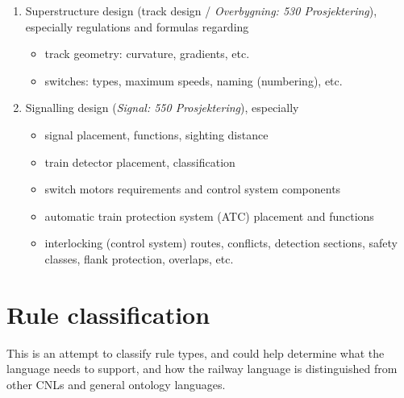 \documentclass[]{article}
\providecommand{\tightlist}{%
  \setlength{\itemsep}{0pt}\setlength{\parskip}{0pt}}
\begin{document}
\begin{enumerate}
\def\labelenumi{\arabic{enumi}.}
\tightlist
\item
  Superstructure design (track design / \emph{Overbygning: 530
  Prosjektering}), especially regulations and formulas regarding

  \begin{itemize}
  \tightlist
  \item
    track geometry: curvature, gradients, etc.
  \item
    switches: types, maximum speeds, naming (numbering), etc.
  \end{itemize}
\item
  Signalling design (\emph{Signal: 550 Prosjektering}), especially

  \begin{itemize}
  \tightlist
  \item
    signal placement, functions, sighting distance
  \item
    train detector placement, classification
  \item
    switch motors requirements and control system components
  \item
    automatic train protection system (ATC) placement and functions
  \item
    interlocking (control system) routes, conflicts, detection sections,
    safety classes, flank protection, overlaps, etc.
  \end{itemize}
\end{enumerate}

\section{Rule classification}\label{rule-classification}

This is an attempt to classify rule types, and could help determine what
the language needs to support, and how the railway language is
distinguished from other CNLs and general ontology languages.
\end{document}
